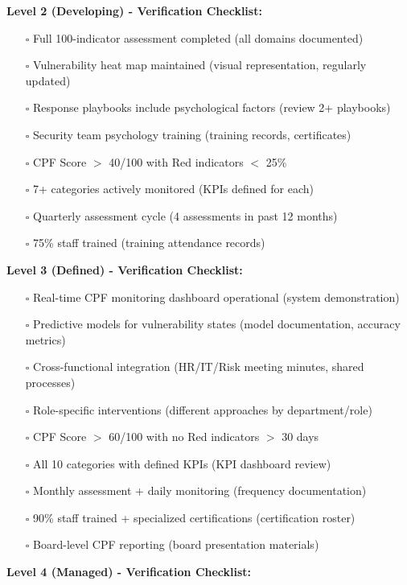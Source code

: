 \documentclass[11pt,a4paper]{article}
\begin{document}
\textbf{Level 2 (Developing) - Verification Checklist:}

\begin{itemize}
\item[$\square$] Full 100-indicator assessment completed (all domains documented)
\item[$\square$] Vulnerability heat map maintained (visual representation, regularly updated)
\item[$\square$] Response playbooks include psychological factors (review 2+ playbooks)
\item[$\square$] Security team psychology training (training records, certificates)
\item[$\square$] CPF Score $>$ 40/100 with Red indicators $<$ 25\%
\item[$\square$] 7+ categories actively monitored (KPIs defined for each)
\item[$\square$] Quarterly assessment cycle (4 assessments in past 12 months)
\item[$\square$] 75\% staff trained (training attendance records)
\end{itemize}

\textbf{Level 3 (Defined) - Verification Checklist:}

\begin{itemize}
\item[$\square$] Real-time CPF monitoring dashboard operational (system demonstration)
\item[$\square$] Predictive models for vulnerability states (model documentation, accuracy metrics)
\item[$\square$] Cross-functional integration (HR/IT/Risk meeting minutes, shared processes)
\item[$\square$] Role-specific interventions (different approaches by department/role)
\item[$\square$] CPF Score $>$ 60/100 with no Red indicators $>$ 30 days
\item[$\square$] All 10 categories with defined KPIs (KPI dashboard review)
\item[$\square$] Monthly assessment + daily monitoring (frequency documentation)
\item[$\square$] 90\% staff trained + specialized certifications (certification roster)
\item[$\square$] Board-level CPF reporting (board presentation materials)
\end{itemize}

\textbf{Level 4 (Managed) - Verification Checklist:}
\end{document}
